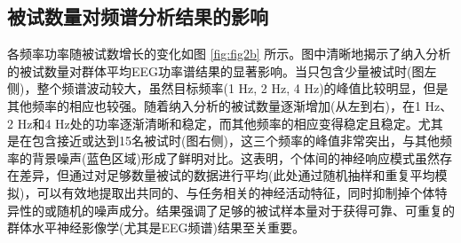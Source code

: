 \documentclass[jou,12pt,floatsintext]{apa7} %
\begin{document}
\subsection{\heiti 被试数量对频谱分析结果的影响}

各频率功率随被试数增长的变化如图 \ref{fig:fig2b} 所示。图中清晰地揭示了纳入分析的被试数量对群体平均EEG功率谱结果的显著影响。当只包含少量被试时(图左侧)，整个频谱波动较大，虽然目标频率(1 Hz, 2 Hz, 4 Hz)的峰值比较明显，但是其他频率的相应也较强。随着纳入分析的被试数量逐渐增加(从左到右)，在1 Hz、2 Hz和4 Hz处的功率逐渐清晰和稳定，而其他频率的相应变得稳定且稳定。尤其是在包含接近或达到15名被试时(图右侧)，这三个频率的峰值非常突出，与其他频率的背景噪声(蓝色区域)形成了鲜明对比。这表明，个体间的神经响应模式虽然存在差异，但通过对足够数量被试的数据进行平均(此处通过随机抽样和重复平均模拟)，可以有效地提取出共同的、与任务相关的神经活动特征，同时抑制掉个体特异性的或随机的噪声成分。结果强调了足够的被试样本量对于获得可靠、可重复的群体水平神经影像学(尤其是EEG频谱)结果至关重要。


\printbibliography[title={\heiti 参\ 考\ 文\ 献}]
\end{document}
